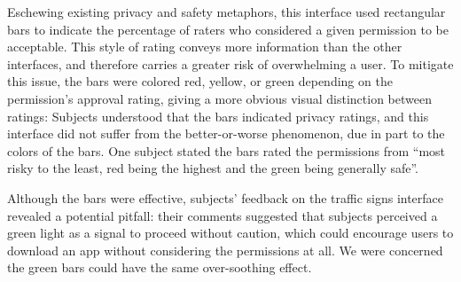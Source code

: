 \documentclass[11pt]{article}
\begin{document}
Eschewing existing privacy and safety metaphors,
this interface used rectangular bars to indicate 
the percentage of raters who considered a given permission to be acceptable.
This style of rating conveys more information than the other
interfaces, and therefore carries a greater risk of overwhelming a user. To mitigate this 
issue, the bars were colored red, yellow, or green depending on the permission's approval 
rating, giving a more obvious visual distinction between ratings:
\label{ss-sec-pbars-r1}
Subjects understood that the bars indicated privacy ratings, 
and this interface did not suffer from the better-or-worse
phenomenon, due in part to the colors of the bars. 
One subject stated the bars rated the permissions from ``most risky to the least, 
red being the highest and the green being generally safe''.

Although the bars were effective, subjects' feedback on 
the traffic signs interface  
revealed a potential pitfall: their comments suggested that subjects 
perceived a green light as a signal to proceed without caution, which could 
encourage users to download an app without considering the permissions at all. 
We were concerned the green bars 
could have the same over-soothing effect.
\end{document}
